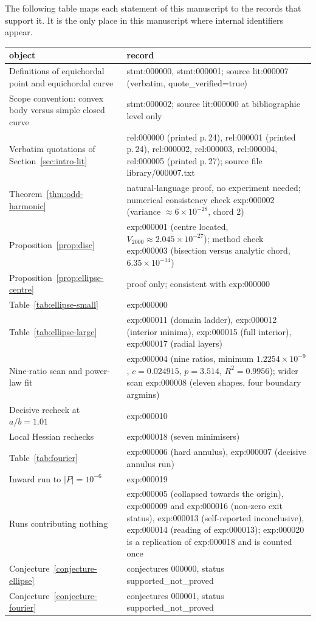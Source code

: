 \documentclass[11pt]{article}
\theoremstyle{definition}
\theoremstyle{remark}
\begin{document}
The following table maps each statement of this manuscript to the records that support it. It is the only place in
this manuscript where internal identifiers appear.
\begin{center}
\small
\begin{tabular}{@{}p{4.2cm}p{9.6cm}@{}}
\toprule
object & record \\
\midrule
Definitions of equichordal point and equichordal curve & stmt:000000, stmt:000001; source lit:000007 (verbatim, quote\_verified=true) \\
Scope convention: convex body versus simple closed curve & stmt:000002; source lit:000000 at bibliographic level only \\
Verbatim quotations of Section~\ref{sec:intro-lit} & rel:000000 (printed p.\,24), rel:000001 (printed p.\,24), rel:000002, rel:000003, rel:000004, rel:000005 (printed p.\,27); source file library/000007.txt \\
Theorem~\ref{thm:odd-harmonic} & natural-language proof, no experiment needed; numerical consistency check exp:000002 (variance $\approx6\times10^{-28}$, chord $2$) \\
Proposition~\ref{prop:disc} & exp:000001 (centre located, $V_{2000}\approx2.045\times10^{-27}$); method check exp:000003 (bisection versus analytic chord, $6.35\times10^{-14}$) \\
Proposition~\ref{prop:ellipse-centre} & proof only; consistent with exp:000000 \\
Table~\ref{tab:ellipse-small} & exp:000000 \\
Table~\ref{tab:ellipse-large} & exp:000011 (domain ladder), exp:000012 (interior minima), exp:000015 (full interior), exp:000017 (radial layers) \\
Nine-ratio scan and power-law fit & exp:000004 (nine ratios, minimum $1.2254\times10^{-9}$, $c=0.024915$, $p=3.514$, $R^2=0.9956$); wider scan exp:000008 (eleven shapes, four boundary argmins) \\
Decisive recheck at $a/b=1.01$ & exp:000010 \\
Local Hessian rechecks & exp:000018 (seven minimisers) \\
Table~\ref{tab:fourier} & exp:000006 (hard annulus), exp:000007 (decisive annulus run) \\
Inward run to $|P|=10^{-6}$ & exp:000019 \\
Runs contributing nothing & exp:000005 (collapsed towards the origin), exp:000009 and exp:000016 (non-zero exit status), exp:000013 (self-reported inconclusive), exp:000014 (reading of exp:000013); exp:000020 is a replication of exp:000018 and is counted once \\
Conjecture~\ref{conjecture-ellipse} & conjectures 000000, status supported\_not\_proved \\
Conjecture~\ref{conjecture-fourier} & conjectures 000001, status supported\_not\_proved \\
\bottomrule
\end{tabular}
\end{center}
\end{document}
